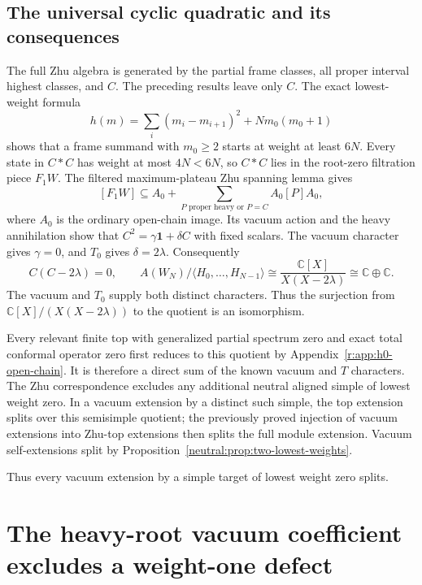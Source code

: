 \documentclass[11pt,a4paper]{article}
\numberwithin{equation}{section}
\theoremstyle{definition}\newtheorem{definition}[theorem]{Definition}
\theoremstyle{remark}\newtheorem{remark}[theorem]{Remark}
\begin{document}
\subsection{The universal cyclic quadratic and its consequences}

The full Zhu algebra is generated by the partial frame classes, all proper
interval highest classes, and $C$.  The preceding results leave only $C$.
The exact lowest-weight formula
\[
 h(m)=\sum_i(m_i-m_{i+1})^2+Nm_0(m_0+1)
\]
shows that a frame summand with $m_0\geq2$ starts at weight at least $6N$.
Every state in $C*C$ has weight at most $4N<6N$, so $C*C$ lies in the
root-zero filtration piece $F_1W$.  The filtered maximum-plateau Zhu
spanning lemma gives
\[
 [F_1W]\subseteq A_0+
 \sum_{P\text{ proper heavy or }P=C}A_0[P]A_0,
\]
where $A_0$ is the ordinary open-chain image.  Its vacuum action and the
heavy annihilation show that $C^2=\gamma\mathbf1+\delta C$ with fixed
scalars.  The vacuum character gives $\gamma=0$, and $T_0$ gives
$\delta=2\lambda$.  Consequently
\[
 C(C-2\lambda)=0,
 \qquad
 A(W_N)/\langle H_0,\ldots,H_{N-1}\rangle
 \cong\frac{\mathbb C[X]}{X(X-2\lambda)}
 \cong\mathbb C\oplus\mathbb C.
\]
The vacuum and $T_0$ supply both distinct characters.  Thus the
surjection from $\mathbb C[X]/(X(X-2\lambda))$ to the quotient is
an isomorphism.

Every relevant finite top with generalized partial spectrum zero and
exact total conformal operator zero first reduces to this quotient by
Appendix~\ref{r:app:h0-open-chain}.  It is therefore a direct sum of the
known vacuum and $T$ characters.  The Zhu correspondence excludes any
additional neutral aligned simple of lowest weight zero.  In a vacuum
extension by a distinct such simple, the top extension splits over this
semisimple quotient; the previously proved injection of vacuum extensions
into Zhu-top extensions then splits the full module extension.  Vacuum
self-extensions split by
Proposition~\ref{neutral:prop:two-lowest-weights}.

Thus every vacuum extension by a simple target of lowest weight
zero splits.


\section{The heavy-root vacuum coefficient excludes a weight-one defect}
\label{r:app:heavy-vacuum-obstruction}
\end{document}
